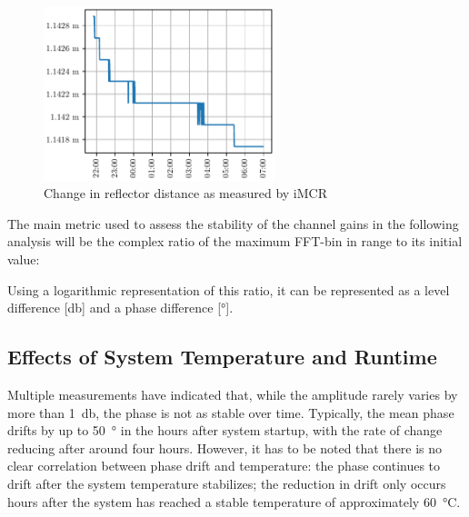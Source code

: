 \begin{figure}
    \centering
    \includegraphics[width=0.6\textwidth]{../figures/refldist.pdf}
    \caption{Change in reflector distance as measured by iMCR}
    \label{fig:refldist}
\end{figure}

The main metric used to assess the stability of the channel gains in the following analysis will be the complex ratio of the maximum FFT-bin in range to its initial value:

Using a logarithmic representation of this ratio, it can be represented as a level difference [\unit{\decibel}] and a phase difference [\unit{\degree}].

\subsection{Effects of System Temperature and Runtime}

Multiple measurements have indicated that, while the amplitude rarely varies by more than \SI{1}{\decibel}, the phase is not as stable over time.
Typically, the mean phase drifts by up to \SI{50}{\degree} in the hours after system startup, with the rate of change reducing after around four hours.
However, it has to be noted that there is no clear correlation between phase drift and temperature:
the phase continues to drift after the system temperature stabilizes;
the reduction in drift only occurs hours after the system has reached a stable temperature of approximately \SI{60}{\celsius}.

